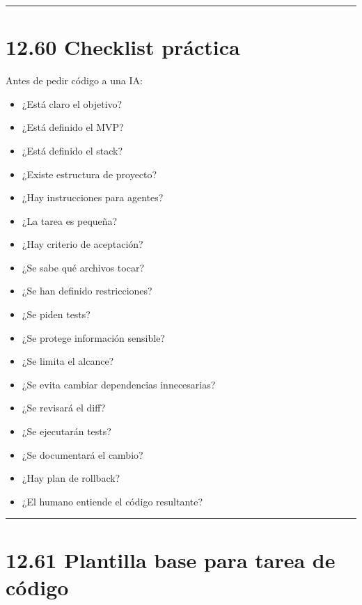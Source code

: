 \begin{center}\rule{0.5\linewidth}{0.5pt}\end{center}

\section{12.60 Checklist práctica}\label{checklist-pruxe1ctica-11}

Antes de pedir código a una IA:

\begin{itemize}
\tightlist
\item
  ¿Está claro el objetivo?
\item
  ¿Está definido el MVP?
\item
  ¿Está definido el stack?
\item
  ¿Existe estructura de proyecto?
\item
  ¿Hay instrucciones para agentes?
\item
  ¿La tarea es pequeña?
\item
  ¿Hay criterio de aceptación?
\item
  ¿Se sabe qué archivos tocar?
\item
  ¿Se han definido restricciones?
\item
  ¿Se piden tests?
\item
  ¿Se protege información sensible?
\item
  ¿Se limita el alcance?
\item
  ¿Se evita cambiar dependencias innecesarias?
\item
  ¿Se revisará el diff?
\item
  ¿Se ejecutarán tests?
\item
  ¿Se documentará el cambio?
\item
  ¿Hay plan de rollback?
\item
  ¿El humano entiende el código resultante?
\end{itemize}

\begin{center}\rule{0.5\linewidth}{0.5pt}\end{center}

\section{12.61 Plantilla base para tarea de
código}\label{plantilla-base-para-tarea-de-cuxf3digo}

